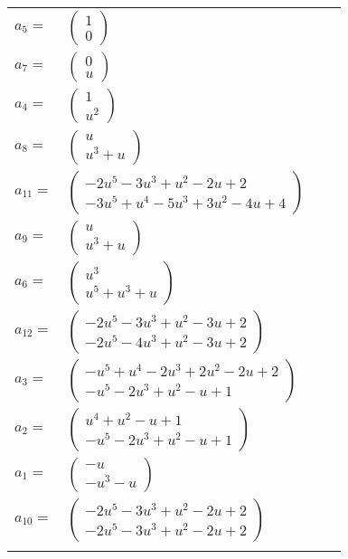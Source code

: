 \documentclass[1p]{elsarticle_modified}
\theoremstyle{definition}
\begin{document}
\begin{tabular}{m{7pt} m{180pt} m{7pt} m{180pt} }
\flushright $a_{5}=$&$\begin{pmatrix}1\\0\end{pmatrix}$ \\
\flushright $a_{7}=$&$\begin{pmatrix}0\\u\end{pmatrix}$ \\
\flushright $a_{4}=$&$\begin{pmatrix}1\\u^2\end{pmatrix}$ \\
\flushright $a_{8}=$&$\begin{pmatrix}u\\u^3+u\end{pmatrix}$ \\
\flushright $a_{11}=$&$\begin{pmatrix}-2 u^5-3 u^3+u^2-2 u+2\\-3 u^5+u^4-5 u^3+3 u^2-4 u+4\end{pmatrix}$ \\
\flushright $a_{9}=$&$\begin{pmatrix}u\\u^3+u\end{pmatrix}$ \\
\flushright $a_{6}=$&$\begin{pmatrix}u^3\\u^5+u^3+u\end{pmatrix}$ \\
\flushright $a_{12}=$&$\begin{pmatrix}-2 u^5-3 u^3+u^2-3 u+2\\-2 u^5-4 u^3+u^2-3 u+2\end{pmatrix}$ \\
\flushright $a_{3}=$&$\begin{pmatrix}- u^5+u^4-2 u^3+2 u^2-2 u+2\\- u^5-2 u^3+u^2- u+1\end{pmatrix}$ \\
\flushright $a_{2}=$&$\begin{pmatrix}u^4+u^2- u+1\\- u^5-2 u^3+u^2- u+1\end{pmatrix}$ \\
\flushright $a_{1}=$&$\begin{pmatrix}- u\\- u^3- u\end{pmatrix}$ \\
\flushright $a_{10}=$&$\begin{pmatrix}-2 u^5-3 u^3+u^2-2 u+2\\-2 u^5-3 u^3+u^2-2 u+2\end{pmatrix}$\\&\end{tabular}
\end{document}
